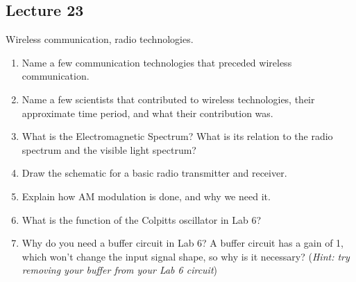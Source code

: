 \subsection*{Lecture 23}

Wireless communication, radio technologies.

\begin{enumerate}
  \item Name a few communication technologies that preceded wireless communication.
  \item Name a few scientists that contributed to wireless technologies, their approximate time period, and what their contribution was.
  \item What is the Electromagnetic Spectrum? What is its relation to the radio spectrum and the visible light spectrum?
  \item Draw the schematic for a basic radio transmitter and receiver.
  \item Explain how AM modulation is done, and why we need it.
  \item What is the function of the Colpitts oscillator in Lab 6?
  \item Why do you need a buffer circuit in Lab 6? A buffer circuit has a gain of 1,
  which won't change the input signal shape, so why is it necessary? (\textit{Hint: try removing your buffer from your Lab 6 circuit})
\end{enumerate}